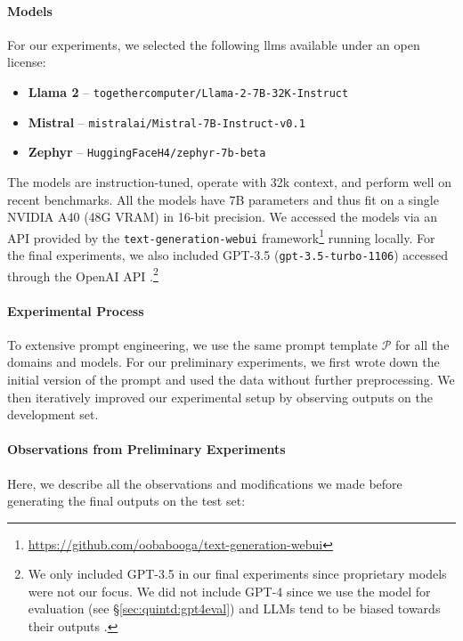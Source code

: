 \paragraph{Models}
\label{sec:quintd:models}
For our experiments, we selected the following \acp{llm} available under an open license:

\begin{itemize}
    \item \textbf{Llama 2} \cite{touvronLlamaOpenFoundation2023,llama-2-7b-32k} -- \texttt{\small together\-computer\-/Llama-2-7B\--32K-Instruct}
    \item \textbf{Mistral} \cite{jiangMistral7B2023} -- \texttt{\small mistralai/Mistral-7B-Instruct-v0.1}
    \item \textbf{Zephyr}  \cite{tunstallZephyrDirectDistillation2023} -- \texttt{\small HuggingFaceH4/zephyr-7b-beta}
\end{itemize}

The models are instruction-tuned, operate with 32k context, and perform well on recent benchmarks. All the models have 7B parameters and thus fit on a single NVIDIA A40 (48G VRAM) in 16-bit precision. We accessed the models via an API provided by the \texttt{text-generation-webui} framework\footnote{\url{https://github.com/oobabooga/text-generation-webui}} running locally.
For the final experiments, we also included GPT-3.5 (\texttt{gpt-3.5-turbo-1106}) accessed through the OpenAI API \cite{chatgpt}.\footnote{We only included GPT-3.5 in our final experiments since proprietary models were not our focus. We did not include GPT-4 since we use the model for evaluation (see §\ref{sec:quintd:gpt4eval}) and LLMs tend to be biased towards their outputs \cite{kooBenchmarkingCognitiveBiases2023,stureborgLargeLanguageModels2024}.}

\paragraph{Experimental Process}
\label{sec:quintd:process}
To extensive prompt engineering, we use the same prompt template $\mathcal{P}$ for all the domains and models. For our preliminary experiments, we first wrote down the initial version of the prompt and used the data without further preprocessing.
We then iteratively improved our experimental setup by observing outputs on the development set.


\paragraph{Observations from Preliminary Experiments}
\label{sec:quintd:observations}
Here, we describe all the observations and modifications we made before generating the final outputs on the test set:

